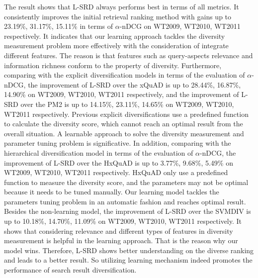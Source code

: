 \documentclass[review]{elsarticle}
\newcommand\revised[1]{{\color{black} #1}}
\begin{document}
The result shows that L-SRD always performs best in terms of all metrics. It consistently improves the initial retrieval ranking method with gains up to \revised{23.19\%, 31.17\%, 15.11\%} in terms of $\alpha$-nDCG on WT2009, WT2010, WT2011 respectively. It indicates that our learning approach tackles the diversity measurement problem more effectively with the consideration of integrate different features. The reason is that features such as query-aspects relevance and information richness conform to the property of diversity. Furthermore, comparing with the explicit diversification models in terms of the evaluation of $\alpha$-nDCG, the improvement of L-SRD over the xQuAD is up to \revised{28.44\%, 16.87\%, 14.90\%} on WT2009, WT2010, WT2011 respectively, and the improvement of L-SRD over the PM2 is up to \revised{14.15\%, 23.11\%, 14.65\%} on WT2009, WT2010, WT2011 respectively. Previous explicit diversifications use a predefined function to calculate the diversity score, which cannot reach an optimal result from the overall situation. A learnable approach to solve the diversity measurement and parameter tuning problem is significative. 
\revised{
	In addition, comparing with the hierarchical diversification model in terms of the evaluation of $\alpha$-nDCG, the improvement of L-SRD over the HxQuAD is up to \revised{3.77\%, 9.68\%, 5.49\%} on WT2009, WT2010, WT2011 respectively. HxQuAD only use a predefined function to measure the diversity score, and the parameters may not be optimal because it needs to be tuned manually. Our learning model tackles the parameters tuning problem in an automatic fashion and reaches optimal result.
	}Besides the non-learning model, the improvement of L-SRD over the SVMDIV is up to 10.18\%, 14.70\%, 11.09\% on WT2009, WT2010, WT2011 respectively. It shows that considering relevance and different types of features in diversity measurement is helpful in the learning approach. That is the reason why our model wins. %
Therefore, L-SRD shows better understanding on the diverse ranking and leads to a better result. So utilizing learning mechanism indeed promotes the performance of search result diversification.
\end{document}
